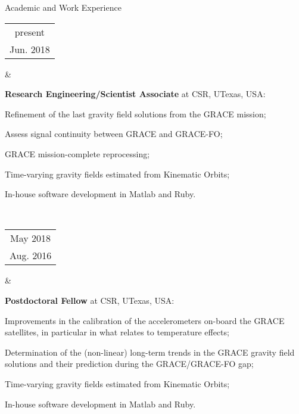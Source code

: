 \documentclass[a4paper,12pt]{article}
\begin{document}

\clearpage


\begin{cvsection}{Academic and Work Experience}

\begin{tabular}{c}
present \\
Jun. 2018 \\ 
\end{tabular} 
&
  \begin{itti}
    \item \textbf{Research Engineering/Scientist Associate} at \acf{CSR}, \acf{UTexas}, \ac{USA}:
    \begin{ittib}
      \item Refinement of the last gravity field solutions from the \acf{GRACE} mission;
      \item Assess signal continuity between \ac{GRACE} and \ac{GRACE-FO};
      \item \ac{GRACE} mission-complete reprocessing;
      \item Time-varying gravity fields estimated from Kinematic Orbits;
      \item In-house software development in Matlab and Ruby.
    \end{ittib}
  \end{itti}\\

\begin{tabular}{c}
May 2018 \\
Aug. 2016 \\ 
\end{tabular} 
&
  \begin{itti}
    \item \textbf{Postdoctoral Fellow} at \acf{CSR}, \acf{UTexas}, \ac{USA}:
    \begin{ittib}
      \item Improvements in the calibration of the accelerometers on-board the \ac{GRACE} satellites, in particular in what relates to temperature effects;
      \item Determination of the (non-linear) long-term trends in the \ac{GRACE} gravity field solutions and their prediction during the \ac{GRACE}\slash\ac{GRACE-FO} gap;
      \item Time-varying gravity fields estimated from Kinematic Orbits;
      \item In-house software development in Matlab and Ruby.
    \end{ittib}
  \end{itti}\\


\end{cvsection}
\end{document}
